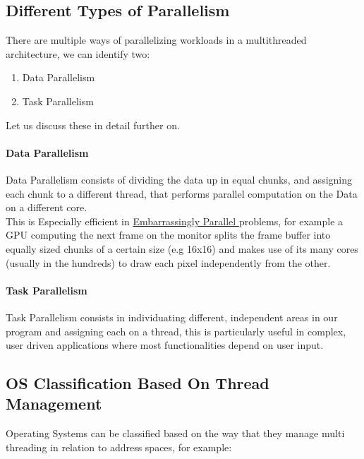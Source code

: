 \documentclass[openright, twoside]{report}
\theoremstyle{definition}
\theoremstyle{example}
\begin{document}
		\subsection{Different Types of Parallelism}
		There are multiple ways of parallelizing workloads in a multithreaded architecture,
		we can identify two:
		\begin{enumerate}
			\item Data Parallelism
			\item Task Parallelism
		\end{enumerate}

		Let us discuss these in detail further on.

			\paragraph{Data Parallelism}
			Data Parallelism consists of dividing the data up in equal chunks, and assigning
			each chunk to a different thread, that performs parallel computation on the Data 
			on a different core.\\

			This is Especially efficient in \href{
				https://en.wikipedia.org/wiki/Embarrassingly_parallel
				}{
					Embarrassingly Parallel
			} problems, for example a GPU computing the next frame on the monitor splits
			the frame buffer into equally sized chunks of a certain size (e.g 16x16)
			and makes use of its many cores (usually in the hundreds) to draw each pixel 
			independently from the other. 


			\paragraph{Task Parallelism}
			Task Parallelism consists in individuating different, independent areas in our 
			program and assigning each on a thread, this is particularly useful in complex,
			user driven applications where most functionalities depend on user input.

		\subsection{OS Classification Based On Thread Management}

		Operating Systems can be classified based on the way that they manage multi threading 
		in relation to address spaces, for example:
\end{document}
